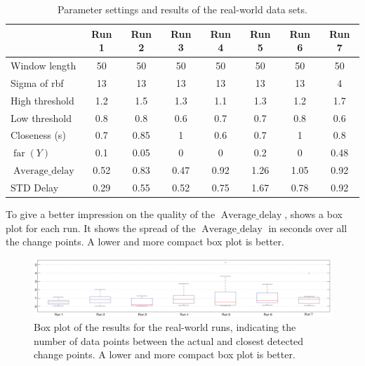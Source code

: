\begin{table}
  \centering
  \begin{tabulary}{\textwidth}{|l|c|c|c|c|c|c|c|}
     & Run 1 & Run 2 & Run 3 & Run 4 & Run 5 & Run 6 & Run 7 \\
    \hline
    Window length & 50 & 50 & 50 & 50 & 50 & 50 & 50 \\
    \hline
    Sigma of \gls{rbf} & 13 & 13 & 13 & 13 & 13 & 13 & 4 \\
    \hline
    High threshold & 1.2 & 1.5 & 1.3 & 1.1 & 1.3 & 1.2 & 1.7 \\
    \hline
    Low threshold & 0.8 & 0.8 & 0.6 & 0.7 & 0.7 & 0.8 & 0.6 \\
    \hline
    Closeness (s) & 0.7 & 0.85 & 1 & 0.6 & 0.7 & 1 & 0.8 \\
    \hline
    \hline
    $\operatorname*{far}(Y)$ & 0.1 & 0.05 & 0 & 0 & 0.2 & 0 & 0.48 \\
    \hline
    $\operatorname*{Average\_delay}$ & 0.52 & 0.83 & 0.47 & 0.92 & 1.26 & 1.05 & 0.92 \\
    \hline
    STD Delay & 0.29 & 0.55 & 0.52 & 0.75 & 1.67 & 0.78 & 0.92 \\
    \hline
  \end{tabulary}
  \caption[Results real world runs]{Parameter settings and results of the real-world data sets.}
  \label{tab:results_real_world}
\end{table}

To give a better impression on the quality of the $\operatorname*{Average\_delay}$,  shows a box plot for each run.
It shows the spread of the $\operatorname*{Average\_delay}$ in seconds over all the change points.
A lower and more compact box plot is better.

\begin{figure}
\centering
  \includegraphics[width=1\textwidth]{./Figures/chapter6/data_collection/boxplot_results_real_world_runs.eps}
  \caption[Box plot results real-world runs]{Box plot of the results for the real-world runs, indicating the number of data points between the actual and closest detected change points. A lower and more compact box plot is better.}
  \label{fig:boxplot_real_world_runs}
\end{figure}

